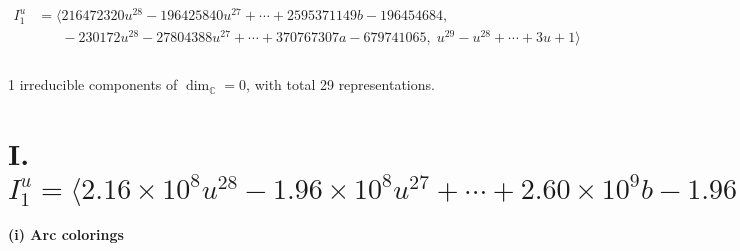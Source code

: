 \documentclass[1p]{elsarticle_modified}
\theoremstyle{definition}
\begin{document}
\begin{align*}
I^u_{1}&=\langle 
216472320 u^{28}-196425840 u^{27}+\cdots+2595371149 b-196454684,\\
\phantom{I^u_{1}}&\phantom{= \langle  }-230172 u^{28}-27804388 u^{27}+\cdots+370767307 a-679741065,\;u^{29}- u^{28}+\cdots+3 u+1\rangle \\
\\
\end{align*}
\raggedright * 1 irreducible components of $\dim_{\mathbb{C}}=0$, with total 29 representations.\\
\newpage
\renewcommand{\arraystretch}{1}
\centering \section*{I. $I^u_{1}= \langle 2.16\times10^{8} u^{28}-1.96\times10^{8} u^{27}+\cdots+2.60\times10^{9} b-1.96\times10^{8},\;-2.30\times10^{5} u^{28}-2.78\times10^{7} u^{27}+\cdots+3.71\times10^{8} a-6.80\times10^{8},\;u^{29}- u^{28}+\cdots+3 u+1 \rangle$}
\flushleft \textbf{(i) Arc colorings}\\
\end{document}
